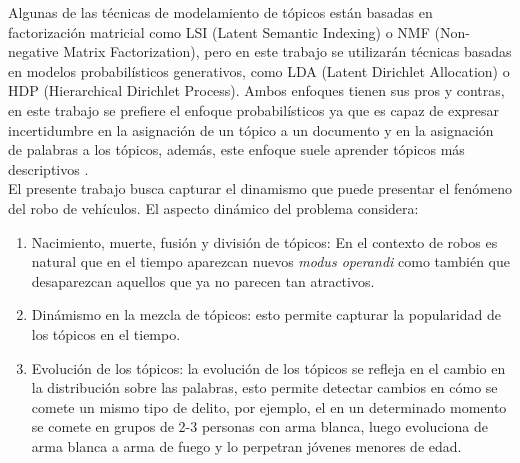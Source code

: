 \documentclass[letterpaper,12pt,oneside]{book} %
\begin{document}
Algunas de las técnicas de modelamiento de tópicos están basadas en factorización matricial como LSI (Latent Semantic Indexing) \citep{dumais2004latent} o NMF (Non-negative Matrix Factorization)\citep{xu2003document}, pero en este trabajo se utilizarán técnicas basadas en modelos probabilísticos generativos, como LDA (Latent Dirichlet Allocation)\citep{blei2003latent} o HDP (Hierarchical Dirichlet Process)\citep{teh2005sharing}. Ambos enfoques tienen sus pros y contras, en este trabajo se prefiere el enfoque probabilísticos ya que es capaz de expresar incertidumbre en la asignación de un tópico a un documento y en la asignación de palabras a los tópicos, además, este enfoque suele aprender tópicos más descriptivos \citep{stevens2012exploring}.\\

El presente trabajo busca capturar el dinamismo que puede presentar el fenómeno del robo de vehículos. El aspecto dinámico del problema considera:
\begin{enumerate}
    \item Nacimiento, muerte, fusión y división de tópicos: En el contexto de robos es natural que en el tiempo aparezcan nuevos \textit{modus operandi} como también que desaparezcan aquellos que ya no parecen tan atractivos.
    \item Dinámismo en la mezcla de tópicos: esto permite capturar la popularidad de los tópicos en el tiempo.
    \item Evolución de los tópicos: la evolución de los tópicos se refleja en el cambio en la distribución sobre las palabras, esto permite detectar cambios en cómo se comete un mismo tipo de delito, por ejemplo, el  en un determinado momento se comete en grupos de 2-3 personas con arma blanca, luego evoluciona de arma blanca a arma de fuego y lo perpetran jóvenes menores de edad.
\end{enumerate}
\end{document}
